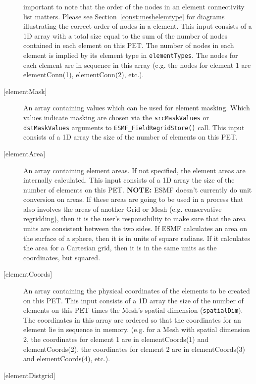 \begin{description}
           important to note that the order of the nodes in an element connectivity list
           matters. Please see Section~\ref{const:meshelemtype} for diagrams illustrating
           the correct order of nodes in a element. This input consists of a 1D array with
           a total size equal to the sum of the number of nodes contained in each element on
           this PET. The number of nodes in each element is implied by its element type in
           {\tt elementTypes}. The nodes for each element
           are in sequence in this array (e.g. the nodes for element 1 are elementConn(1),
           elementConn(2), etc.).
     \item [{[elementMask]}]
            An array containing values which can be used for element masking. Which values indicate
            masking are chosen via the {\tt srcMaskValues} or {\tt dstMaskValues} arguments to
            {\tt ESMF\_FieldRegridStore()} call. This input consists of a 1D array the
            size of the number of elements on this PET.
     \item [{[elementArea]}]
            An array containing element areas. If not specified, the element areas are internally calculated.
            This input consists of a 1D array the size of the number of elements on this PET.
            {\bf NOTE:} ESMF doesn't currently do unit conversion on areas. If these areas are going to be used
                  in a process that also involves the areas of another Grid or Mesh (e.g. conservative regridding), then
                  it is the user's responsibility to make sure that the area units are consistent between the two sides.
                  If ESMF calculates an area on the surface of a sphere, then it is in units of square radians. If
                  it calculates the area for a Cartesian grid, then it is in the same units as the coordinates, but squared.
     \item[{[elementCoords]}]
            An array containing the physical coordinates of the elements to be created on this
            PET. This input consists of a 1D array the size of the number of elements on this PET times the Mesh's
            spatial dimension ({\tt spatialDim}). The coordinates in this array are ordered
            so that the coordinates for an element lie in sequence in memory. (e.g. for a
            Mesh with spatial dimension 2, the coordinates for element 1 are in elementCoords(1) and
            elementCoords(2), the coordinates for element 2 are in elementCoords(3) and elementCoords(4),
            etc.).
     \item [{[elementDistgrid]}]

\end{description}
